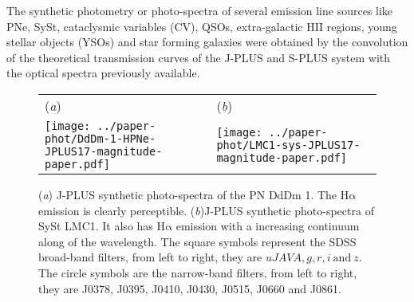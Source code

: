 \documentclass{article}
\newcommand\ha{\ensuremath{\mathrm{H\alpha}}}
\newcommand\A{\ensuremath{\text{\AA{}}}}
\begin{document}




The synthetic photometry or photo-spectra  of several emission line sources like PNe, SySt, cataclysmic variables (CV), QSOs, extra-galactic HII regions, young stellar objects (YSOs) and star forming galaxies were obtained by the convolution of the theoretical transmission curves of the J-PLUS and S-PLUS system with the optical spectra previously available.

\begin{figure}
\centering
\begin{tabular}{l l}
  (\textit{a}) & (\textit{b})  \\
  \texttt{[image: ../paper-phot/DdDm-1-HPNe-JPLUS17-magnitude-paper.pdf]}
  & \texttt{[image: ../paper-phot/LMC1-sys-JPLUS17-magnitude-paper.pdf]}\\
  \end{tabular}  
  \caption{(\textit{a}) J-PLUS synthetic photo-spectra of the PN DdDm 1. The \ha{} emission is clearly perceptible. (\textit{b})J-PLUS synthetic photo-spectra of SySt LMC1. It also has \ha{} emission with a increasing continuum  along of the wavelength. The square symbols represent the SDSS broad-band filters, from left to right, they are \(uJAVA, g, r, i~ \text{and}~ z\). The circle symbols are the narrow-band filters, from left to right, they are J0378, J0395, J0410, J0430, J0515, J0660 and J0861.}
\label{fig:convol}
\end{figure}
\end{document}

